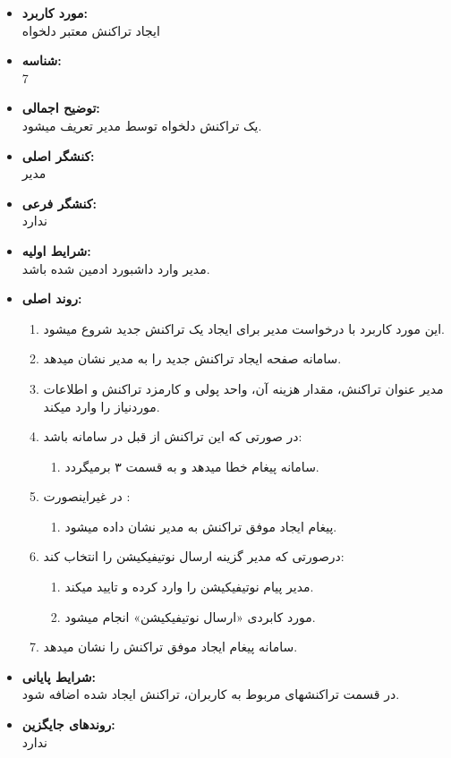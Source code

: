 \documentclass{article}
\begin{document}
\begin{itemize}
\item \textbf{مورد کاربرد:}\\
ایجاد تراکنش معتبر دلخواه
\item \textbf{شناسه:}\\
7
\item \textbf{توضیح اجمالی:}\\
یک تراکنش دلخواه توسط مدیر تعریف میشود.
\item \textbf{کنشگر اصلی:}\\
مدیر
\item \textbf{کنشگر فرعی:}\\
ندارد
\item \textbf{شرایط اولیه:}\\
مدیر وارد داشبورد ادمین شده باشد.
\item \textbf{روند اصلی:}\\
\begin{enumerate}
\item  این مورد کاربرد با درخواست مدیر برای ایجاد یک تراکنش جدید شروع میشود.
\item سامانه صفحه ایجاد تراکنش جدید را به مدیر نشان میدهد.
\item مدیر عنوان تراکنش، مقدار هزینه آن، واحد پولی و کارمزد تراکنش و اطلاعات موردنیاز را وارد میکند.
\item در صورتی که این تراکنش از قبل در سامانه باشد:
\begin{enumerate}
\item سامانه پیغام خطا میدهد و به قسمت ۳ برمیگردد. 
\end{enumerate}

\item در غیراینصورت	:
\begin{enumerate}
\item پیغام ایجاد موفق تراکنش به مدیر نشان داده میشود.
\end{enumerate}
\item  درصورتی که مدیر گزینه ارسال نوتیفیکیشن را انتخاب کند:
\begin{enumerate}
\item مدیر پیام نوتیفیکیشن را وارد کرده و تایید میکند.
\item مورد کابردی «ارسال نوتیفیکیشن» انجام میشود.
\end{enumerate}
\item سامانه پیغام ایجاد موفق تراکنش را نشان میدهد.
\end{enumerate}

\item \textbf{شرایط پایانی:}\\ 
در قسمت تراکنشهای مربوط به کاربران، تراکنش ایجاد شده اضافه شود.
\item \textbf{روندهای جایگزین:}\\
ندارد
\end{itemize}
\end{document}
